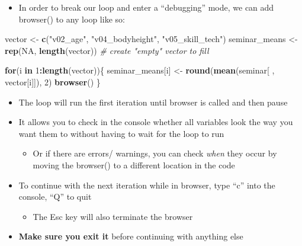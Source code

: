 \documentclass[
]{book}
\newenvironment{Shaded}{\begin{snugshade}}{\end{snugshade}}
\newcommand{\CommentTok}[1]{\textcolor[rgb]{0.56,0.35,0.01}{\textit{#1}}}
\newcommand{\ConstantTok}[1]{\textcolor[rgb]{0.56,0.35,0.01}{#1}}
\newcommand{\ControlFlowTok}[1]{\textcolor[rgb]{0.13,0.29,0.53}{\textbf{#1}}}
\newcommand{\DecValTok}[1]{\textcolor[rgb]{0.00,0.00,0.81}{#1}}
\newcommand{\FunctionTok}[1]{\textcolor[rgb]{0.13,0.29,0.53}{\textbf{#1}}}
\newcommand{\NormalTok}[1]{#1}
\newcommand{\OtherTok}[1]{\textcolor[rgb]{0.56,0.35,0.01}{#1}}
\newcommand{\SpecialCharTok}[1]{\textcolor[rgb]{0.81,0.36,0.00}{\textbf{#1}}}
\newcommand{\StringTok}[1]{\textcolor[rgb]{0.31,0.60,0.02}{#1}}
\providecommand{\tightlist}{%
  \setlength{\itemsep}{0pt}\setlength{\parskip}{0pt}}
\begin{document}
\begin{itemize}
\tightlist
\item
  In order to break our loop and enter a ``debugging'' mode, we can add browser() to any loop like so:
\end{itemize}

\begin{Shaded}
\begin{Highlighting}[]
\NormalTok{vector }\OtherTok{\textless{}{-}} \FunctionTok{c}\NormalTok{(}\StringTok{"v02\_age"}\NormalTok{, }\StringTok{"v04\_bodyheight"}\NormalTok{, }\StringTok{"v05\_skill\_tech"}\NormalTok{)}
\NormalTok{seminar\_means }\OtherTok{\textless{}{-}} \FunctionTok{rep}\NormalTok{(}\ConstantTok{NA}\NormalTok{, }\FunctionTok{length}\NormalTok{(vector)) }\CommentTok{\# create "empty" vector to fill}

\ControlFlowTok{for}\NormalTok{(i }\ControlFlowTok{in} \DecValTok{1}\SpecialCharTok{:}\FunctionTok{length}\NormalTok{(vector))\{}
\NormalTok{  seminar\_means[i] }\OtherTok{\textless{}{-}} \FunctionTok{round}\NormalTok{(}\FunctionTok{mean}\NormalTok{(seminar[ , vector[i]]), }\DecValTok{2}\NormalTok{)}
  \FunctionTok{browser}\NormalTok{()}
\NormalTok{\}}
\end{Highlighting}
\end{Shaded}

\begin{itemize}
\item
  The loop will run the first iteration until browser is called and then pause
\item
  It allows you to check in the console whether all variables look the way you want them to without having to wait for the loop to run

  \begin{itemize}
  \tightlist
  \item
    Or if there are errors/ warnings, you can check \emph{when} they occur by moving the browser() to a different location in the code
  \end{itemize}
\item
  To continue with the next iteration while in browser, type ``c'' into the console, ``Q'' to quit

  \begin{itemize}
  \tightlist
  \item
    The Esc key will also terminate the browser
  \end{itemize}
\item
  \textbf{Make sure you exit it} before continuing with anything else
\end{itemize}
\end{document}
